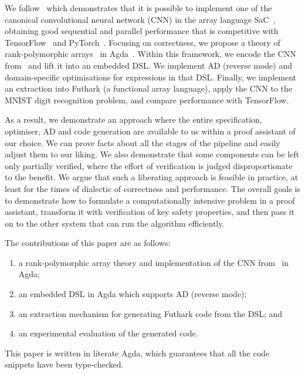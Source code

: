We follow~\cite{cnn-array} which demonstrates that it is possible to implement
one of the canonical convolutional neural network (CNN) in the array language
SaC~\cite{sac1, sac2}, obtaining good sequential and parallel performance that
is competitive with TensorFlow~\cite{ad-tf} and PyTorch~\cite{ad-pytorch}.
Focusing on correctness, we propose a theory of rank-polymorphic
arrays~\cite{rank-poly} in Agda~\cite{agda-2-6-3}. Within this framework, we
encode the CNN from~\cite{cnn-array} and lift it into an embedded DSL. We
implement AD (reverse mode) and domain-specific optimisations for expressions in
that DSL. Finally, we implement an extraction into Futhark (a functional array
language), apply the CNN to the MNIST digit recognition problem, and compare
performance with TensorFlow.

As a result, we demonstrate an approach where the entire specification,
optimiser, AD and code generation are available to us within a proof assistant
of our choice. We can prove facts about all the stages of the pipeline and
easily adjust them to our liking. We also demonstrate that some components can
be left only partially verified, where the effort of verification is judged
disproportionate to the benefit. We argue that such a liberating approach is
feasible in practice, at least for the times of dialectic of correctness and
performance. The overall goals is to demonstrate how to formulate a
computationally intensive problem in a proof assistant, transform it with
verification of key safety properties, and then pass it on to the other system
that can run the algorithm efficiently.

The contributions of this paper are as follows:
\begin{enumerate}
  \item a rank-polymorphic array theory and implementation of
        the CNN from~\cite{cnn-array} in Agda;
  \item an embedded DSL in Agda which supports AD (reverse mode);
  \item an extraction mechanism for generating Futhark code from the DSL; and
  \item an experimental evaluation of the generated code.
\end{enumerate}

This paper is written in literate Agda, which guarantees that all the code
snippets have been type-checked.


